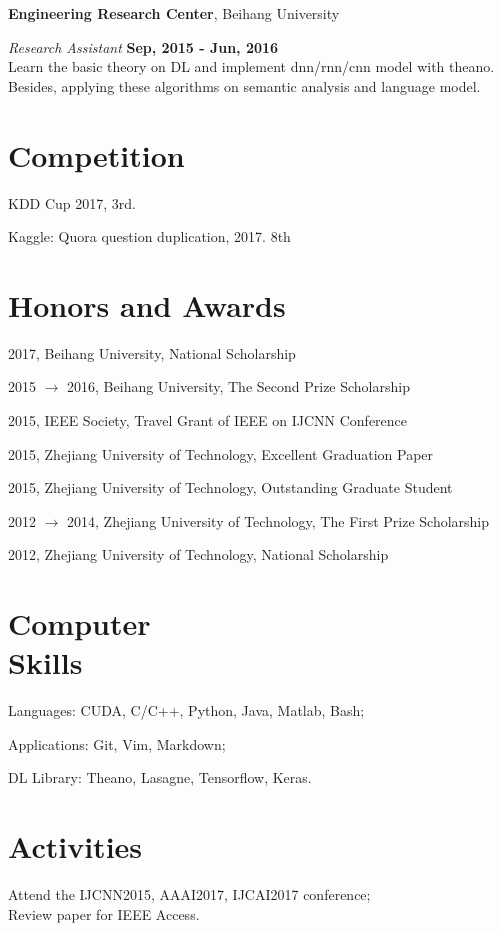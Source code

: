 \documentclass[margin,line]{resume}
\begin{document}
\begin{resume}
{\bf Engineering Research Center}, Beihang University

{\em Research Assistant} \hfill {\bf Sep, 2015 - Jun, 2016}\\
Learn the basic theory on DL and implement dnn/rnn/cnn model with theano. Besides, applying these algorithms on semantic analysis and language model.



\section{Competition}
KDD Cup 2017, 3rd.

Kaggle: Quora question duplication, 2017. 8th

\section{Honors and Awards}

2017, Beihang University, National Scholarship

2015 $\to$ 2016, Beihang University, The Second Prize Scholarship

2015, IEEE Society, Travel Grant of IEEE on IJCNN Conference

2015, Zhejiang University of Technology, Excellent Graduation Paper

2015, Zhejiang University of Technology, Outstanding Graduate Student

2012 $\to$ 2014, Zhejiang University of Technology, The First Prize Scholarship

2012, Zhejiang University of Technology, National Scholarship




\section{Computer \\ Skills}
Languages: CUDA, C/C++, Python, Java, Matlab, Bash;

Applications: Git, Vim, Markdown;

DL Library: Theano, Lasagne, Tensorflow, Keras.\\

\section{Activities}
Attend the IJCNN2015, AAAI2017, IJCAI2017 conference;\\
Review paper for IEEE Access.

\end{resume}
\end{document}
